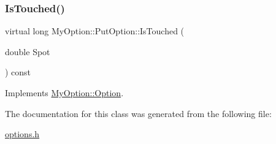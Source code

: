 \subsubsection{\texorpdfstring{Is\+Touched()}{IsTouched()}}
{\footnotesize\ttfamily virtual long My\+Option\+::\+Put\+Option\+::\+Is\+Touched (\begin{DoxyParamCaption}\item[{double}]{Spot }\end{DoxyParamCaption}) const\hspace{0.3cm}{\ttfamily [virtual]}}



Implements \hyperlink{classMyOption_1_1Option_ade57d2fcb9f22f3c2a57d75f55444c33}{My\+Option\+::\+Option}.



The documentation for this class was generated from the following file\+:\begin{DoxyCompactItemize}
\item 
\hyperlink{options_8h}{options.\+h}\end{DoxyCompactItemize}
